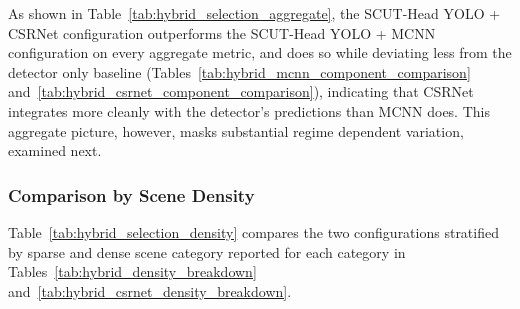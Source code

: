 \documentclass[12pt,a4paper]{report}
\begin{document}
As shown in Table~\ref{tab:hybrid_selection_aggregate}, the SCUT-Head YOLO + CSRNet configuration outperforms the SCUT-Head YOLO + MCNN configuration on every aggregate metric, and does so while deviating less from the detector only baseline (Tables~\ref{tab:hybrid_mcnn_component_comparison} and~\ref{tab:hybrid_csrnet_component_comparison}), indicating that CSRNet integrates more cleanly with the detector's predictions than MCNN does. This aggregate picture, however, masks substantial regime dependent variation, examined next.

\subsubsection{Comparison by Scene Density}

Table~\ref{tab:hybrid_selection_density} compares the two configurations stratified by sparse and dense scene category reported for each category in Tables~\ref{tab:hybrid_density_breakdown} and~\ref{tab:hybrid_csrnet_density_breakdown}.
\end{document}
